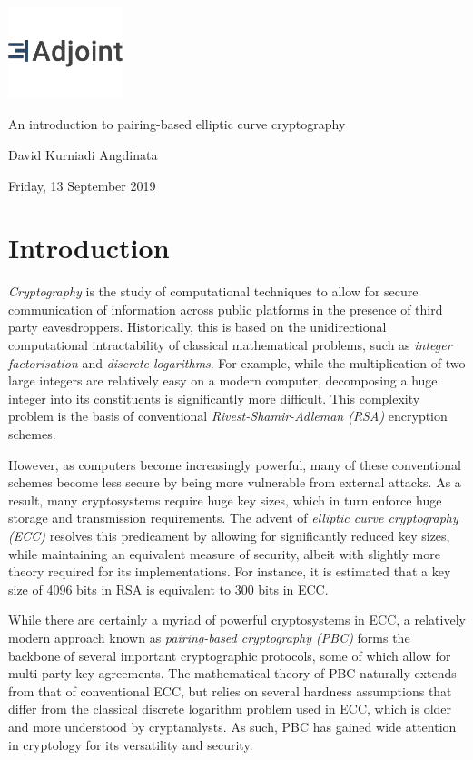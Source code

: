\documentclass{article}
\theoremstyle{definition}
\begin{document}
\begin{center}
\includegraphics[width=0.25\textwidth]{adjoint.png}

{\LARGE An introduction to pairing-based elliptic curve cryptography}

\vspace{0.25in}

{\large David Kurniadi Angdinata}

\vspace{0.125in}

{\large Friday, 13 September 2019}
\end{center}

\section{Introduction}

\emph{Cryptography} is the study of computational techniques to allow for secure communication of information across public platforms in the presence of third party eavesdroppers. Historically, this is based on the unidirectional computational intractability of classical mathematical problems, such as \emph{integer factorisation} and \emph{discrete logarithms}. For example, while the multiplication of two large integers are relatively easy on a modern computer, decomposing a huge integer into its constituents is significantly more difficult. This complexity problem is the basis of conventional \emph{Rivest-Shamir-Adleman (RSA)} encryption schemes.

However, as computers become increasingly powerful, many of these conventional schemes become less secure by being more vulnerable from external attacks. As a result, many cryptosystems require huge key sizes, which in turn enforce huge storage and transmission requirements. The advent of \emph{elliptic curve cryptography (ECC)} resolves this predicament by allowing for significantly reduced key sizes, while maintaining an equivalent measure of security, albeit with slightly more theory required for its implementations. For instance, it is estimated that a key size of 4096 bits in RSA is equivalent to 300 bits in ECC.

While there are certainly a myriad of powerful cryptosystems in ECC, a relatively modern approach known as \emph{pairing-based cryptography (PBC)} forms the backbone of several important cryptographic protocols, some of which allow for multi-party key agreements. The mathematical theory of PBC naturally extends from that of conventional ECC, but relies on several hardness assumptions that differ from the classical discrete logarithm problem used in ECC, which is older and more understood by cryptanalysts. As such, PBC has gained wide attention in cryptology for its versatility and security.
\end{document}
